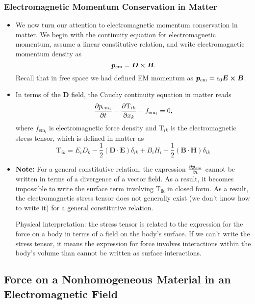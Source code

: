 \documentclass[11pt, a4paper]{article}
\renewcommand{\vec}[1]{\bm{#1}} %
\newcommand{\E}{\vec{E}} %
\newcommand{\D}{\vec{D}}  %
\newcommand{\B}{\vec{B}} %
\renewcommand{\H}{\vec{H}}  %
\newcommand{\TT}{\mathrm{T}}  %
\newcommand{\ee}{\epsilon_{0}}  %
\begin{document}
\subsubsection{Electromagnetic Momentum Conservation in Matter}
\begin{itemize}
	\item We now turn our attention to electromagnetic momentum conservation in matter. We begin with the continuity equation for electromagnetic momentum, assume a linear constitutive relation, and write electromagnetic momentum density as
	\begin{equation*}
		\vec{p}_{\text{em}} = \D \cross \B.
	\end{equation*}
	Recall that in free space we had defined EM momentum as $ \vec{p}_{\text{em}} = \ee \E \cross \B $.
	
	\item In terms of the $ \D $ field, the Cauchy continuity equation in matter reads
	\begin{equation*}
		\pdv{p_{\text{em}_{i}}}{t} - \pdv{\TT_{ik}}{x_{k}} + f_{\text{em}_{i}} = 0,
	\end{equation*}
	where $ f_{\text{em}_{i}} $ is electromagnetic force density and $ \TT_{ik} $ is the electromagnetic stress tensor, which is defined in matter as
	\begin{equation*}
		\TT_{ik} = E_{i}D_{k} - \frac{1}{2}(\D \cdot \E)\delta_{ik} + B_{i}H_{i} - \frac{1}{2}(\B \cdot \H)\delta _{ik}
	\end{equation*}
	
	\item \textbf{Note:} For a general constitutive relation, the expression $ \pdv{\vec{p}_{\text{em}} }{t} $ cannot be written in terms of a divergence of a vector field. As a result, it becomes impossible to write the surface term involving $ \TT_{\text{ik}} $ in closed form. As a result, the electromagnetic stress tensor does not generally exist (we don't know how to write it) for a general constitutive relation.
	
	Physical interpretation: the stress tensor is related to the expression for the force on a body in terms of a field on the body's surface. If we can't write the stress tensor, it means the expression for force involves interactions within the body's volume than cannot be written as surface interactions.
	
\end{itemize}


\subsection{Force on a Nonhomogeneous Material in an Electromagnetic Field}
\end{document}
